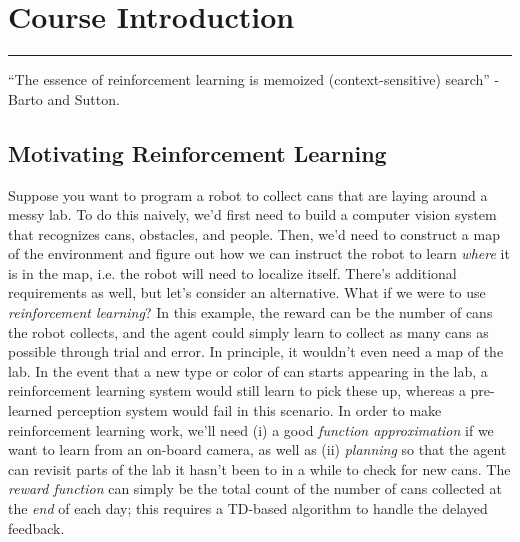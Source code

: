 \documentclass[12pt]{article}
\begin{document}
\renewcommand{\d}[1]{\ensuremath{\operatorname{d}\!{#1}}}

\tableofcontents
\newpage
\section{Course Introduction}\vspace{.1pt} \hrule height 2pt \smallskip \renewcommand{\arraystretch}{1}
``The essence of reinforcement learning is memoized (context-sensitive) search'' -Barto and Sutton.
\vspace{-10pt}
\subsection{Motivating Reinforcement Learning}
Suppose you want to program a robot to collect cans that are laying around a messy lab. To do this naively, we'd first need to build a computer vision system that recognizes cans, obstacles, and people. Then, we'd need to construct a map of the environment and figure out how we can instruct the robot to learn \emph{where} it is in the map, i.e. the robot will need to localize itself. There's additional requirements as well, but let's consider an alternative. What if we were to use \emph{reinforcement learning}? In this example, the reward can be the number of cans the robot collects, and the agent could simply learn to collect as many cans as possible through trial and error. In principle, it wouldn't even need a map of the lab. In the event that a new type or color of can starts appearing in the lab, a reinforcement learning system would still learn to pick these up, whereas a pre-learned perception system would fail in this scenario. In order to make reinforcement learning work, we'll need (i) a good \emph{function approximation} if we want to learn from an on-board camera, as well as (ii) \emph{planning} so that the agent can revisit parts of the lab it hasn't been to in a while to check for new cans. The \emph{reward function} can simply be the total count of the number of cans collected at the \emph{end} of each day; this requires a TD-based algorithm to handle the delayed feedback.
\end{document}
